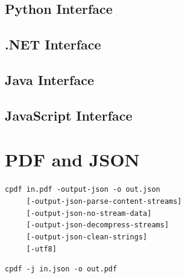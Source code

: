 \documentclass{book}
\begin{document}
\begin{pycpdflib}
\clearpage
\section*{Python Interface}
\begin{small}\tt

\end{small}
\end{pycpdflib}

\begin{dotnetcpdflib}
\clearpage
\section*{.NET Interface}
\begin{small}\tt

\end{small}
\end{dotnetcpdflib}

\begin{jcpdflib}
\clearpage
\section*{Java Interface}
\begin{small}\tt

\end{small}
\end{jcpdflib}

\begin{jscpdflib}
\clearpage
\section*{JavaScript Interface}
\begin{small}\tt

\end{small}
\end{jscpdflib}

\chapter{PDF and JSON}\label{chap:15}\pagestyle{fancy}
  {\small\begin{framed}
  \noindent\verb!cpdf in.pdf -output-json -o out.json!\\
  \noindent\verb!     [-output-json-parse-content-streams]!\\
  \noindent\verb!     [-output-json-no-stream-data]!\\
  \noindent\verb!     [-output-json-decompress-streams]!\\
  \noindent\verb!     [-output-json-clean-strings]!\\
  \noindent\verb!     [-utf8]!

\vspace{1.5mm}

  \noindent\verb!cpdf -j in.json -o out.pdf!
  \end{framed}}
\end{document}
